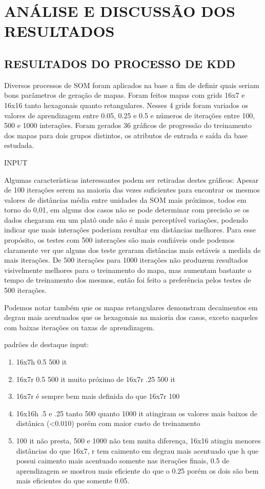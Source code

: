 
\chapter{ANÁLISE E DISCUSSÃO DOS RESULTADOS}
\label{chap:resultados}

\section{RESULTADOS DO PROCESSO DE KDD}
\label{sec:resultadosRegressao}
Diversos processos de SOM foram aplicados na base a fim de definir quais seriam bons parâmetros de geração de mapas. Foram feitos mapas com grids 16x7 e 16x16 tanto hexagonais quanto retangulares. Nesses 4 grids foram variados os valores de aprendizagem entre 0.05, 0.25 e 0.5 e números de iterações entre 100, 500 e 1000 interações. Foram gerados 36 gráficos de progressão do treinamento dos mapas para dois grupos distintos, os atributos de entrada e saída da base estudada. 

INPUT

Algumas características interessantes podem ser retiradas destes gráficos: Apesar de 100 iterações serem na maioria das vezes suficientes para encontrar os mesmos valores de distâncias média entre unidades da SOM mais próximos, todos em torno do 0,01, em alguns dos casos não se pode determinar com precisão se os dados chegaram em um platô onde não é mais perceptível variações, podendo indicar que mais interações poderiam resultar em distâncias melhores. Para esse propósito, os testes com 500 interações são mais confiáveis onde podemos claramente ver que alguns dos teste geraram distâncias mais estáveis a medida de mais iterações. De 500 iterações para 1000 iterações não produzem resultados visivelmente melhores para o treinamento do mapa, mas aumentam bastante o tempo de treinamento dos mesmos, então foi feito a preferência pelos testes de 500 iterações.

Podemos notar também que os mapas retangulares demonstram decaimentos em degrau mais acentuados que os hexagonais na maioria dos casos, exceto naqueles com baixas iterações ou taxas de aprendizagem.

padrões de destaque input:
\begin{enumerate}
	\item 16x7h 0.5 500 it
	\item 16x7r 0.5 500 it muito próximo de 16x7r .25 500 it
	\item 16x7r é sempre bem mais definida do que 16x7r 100
	\item 16x16h .5 e .25 tanto 500 quanto 1000 it atingiram os valores mais baixos de distânica (<0.010)  porém com maior custo de treinamento
	\item 100 it não presta, 500 e 1000 não tem muita diferença, 16x16 atingiu menores distâncias do que 16x7, r tem caimento em degrau mais acentuado que h que possui caimento mais acentuado somente nas iterações finais, 0.5 de aprendizagem se mostrou mais eficiente do que o 0.25 porém os dois são bem mais eficientes do que somente 0.05.
\end{enumerate}


